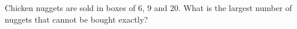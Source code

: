 Chicken nuggets are sold in boxes of $6$, $9$ and $20$. What is the largest number of nuggets that cannot be bought exactly?
